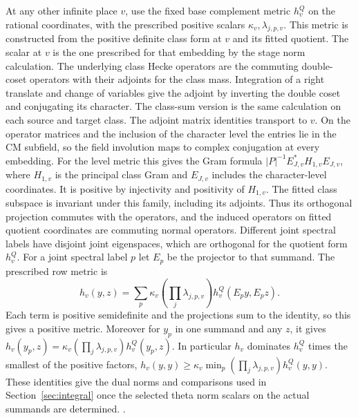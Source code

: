 At any other infinite place \(v\), use the fixed base
complement metric \(h^Q_v\) on the rational coordinates, with
the prescribed positive scalars \(\kappa_v,\lambda_{j,p,v}\).
This metric is constructed from the positive definite class form
at \(v\) and its fitted quotient. The scalar at \(v\) is the
one prescribed for that embedding by the stage norm calculation.
The underlying class Hecke operators are the commuting
double-coset operators with their adjoints for the class
mass. Integration of a right translate and change of variables
give the adjoint by inverting the double coset and conjugating
its character. The class-sum version is the same calculation
on each source and target class. The adjoint matrix identities
transport to \(v\). On the operator matrices and the inclusion of
the character level the entries lie in the CM subfield, so the
field involution maps to complex conjugation at every embedding.
For the level metric this gives the Gram formula
\(|P|^{-1}E_{J,v}^*H_{1,v}E_{J,v}\), where \(H_{1,v}\) is the
principal class Gram and \(E_{J,v}\) includes the character-level
coordinates. It is positive by injectivity and positivity of
\(H_{1,v}\).
The fitted class subspace is invariant under this family,
including its adjoints. Thus its orthogonal projection
commutes with the operators, and the induced operators on
fitted quotient coordinates are commuting normal operators.
Different joint spectral labels have disjoint joint eigenspaces,
which are orthogonal for the quotient form \(h^Q_v\).
For a joint spectral label \(p\) let \(E_p\) be the projector
to that summand. The prescribed row metric is
\[
 h_v(y,z)=\sum_p
     \kappa_v\left(\prod_j\lambda_{j,p,v}\right)
     h_v^Q(E_p y,E_p z).
\]
Each term is positive semidefinite and the projections sum to
the identity, so this gives a positive metric. Moreover for
\(y_p\) in one summand and any \(z\), it gives
\(h_v(y_p,z)=\kappa_v(\prod_j\lambda_{j,p,v})h_v^Q(y_p,z)\).
In particular \(h_v\) dominates \(h^Q_v\) times the smallest
of the positive factors,
\(h_v(y,y)\ge\kappa_v\min_p(\prod_j\lambda_{j,p,v})h^Q_v(y,y)\).
These identities give the dual norms and comparisons used in
Section~\ref{sec:integral} once the selected theta norm
scalars on the actual summands are determined.
.

